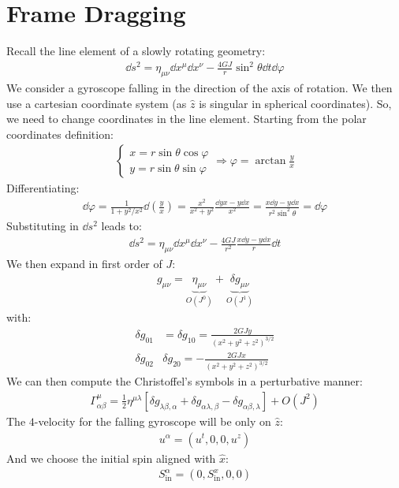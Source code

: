 \documentclass[../template.tex]{subfiles}
\begin{document}
\section{Frame Dragging}
Recall the line element of a slowly rotating geometry:
\begin{align*}
    \dd{s}^2 = \eta_{\mu \nu} \dd{x^\mu} \dd{x^\nu} - \frac{4GJ}{r} \sin^2 \theta \dd{t} \dd{\varphi} 
\end{align*}
We consider a gyroscope falling in the direction of the axis of rotation. We then use a cartesian coordinate system (as $\hat{z}$ is singular in spherical coordinates). So, we need to change coordinates in the line element. Starting from the polar coordinates definition:
\begin{align*}
    \begin{cases}
        x = r\sin \theta \cos \varphi\\
        y = r \sin \theta \sin \varphi
    \end{cases} \Rightarrow \varphi = \arctan \frac{y}{x} 
\end{align*}
Differentiating:
\begin{align*}
    \dd{\varphi} = \frac{1}{1+y^2/x^2} \dd{}\left(\frac{y}{x} \right) = \frac{x^2}{x^2 + y^2} \frac{\dd{y} x - y \dd{x}}{x^2} = \frac{x\dd{y} - y \dd{x}}{r^2 \sin^2 \theta} = \dd{\varphi}   
\end{align*}
Substituting in $\dd{s}^2$ leads to:
\begin{align*}
    \dd{s}^2 = \eta_{\mu \nu} \dd{x^\mu}\dd{x^\nu} - \frac{4GJ}{r^2} \frac{x \dd{y} - y\dd{x}}{r} \dd{t}  
\end{align*} 
We then expand in first order of $J$:
\begin{align*}
    g_{\mu \nu} = \underbrace{\eta_{\mu \nu}}_{O(J^0)} + \underbrace{\delta g_{\mu \nu}}_{O(J^1)}  
\end{align*} 
with:
\begin{align*}
    \delta g_{01} &= \delta g_{10} = \frac{2GJy}{(x^2 + y^2 + z^2)^{3/2}} \\
    \delta g_{02} & \delta g_{20} = -\frac{2GJx}{(x^2 + y^2 + z^2)^{3/2}} 
\end{align*}
We can then compute the Christoffel's symbols in a perturbative manner:
\begin{align*}
    \Gamma^\mu_{\alpha \beta} = \frac{1}{2} \eta^{\mu \lambda} \left[\delta g_{\lambda \beta, \alpha} + \delta g_{\alpha \lambda, \beta} - \delta g_{\alpha \beta, \lambda}\right] + O(J^2)
\end{align*}
The $4$-velocity for the falling gyroscope will be only on $\hat{z}$:
\begin{align*}
    u^\alpha = (u^t, 0, 0, u^z)
\end{align*}  
And we choose the initial spin aligned with $\hat{x}$:
\begin{align*}
    S^\alpha_{\mathrm{in} } = (0, S_{\mathrm{in} }^x, 0, 0)
\end{align*} 
\end{document}
